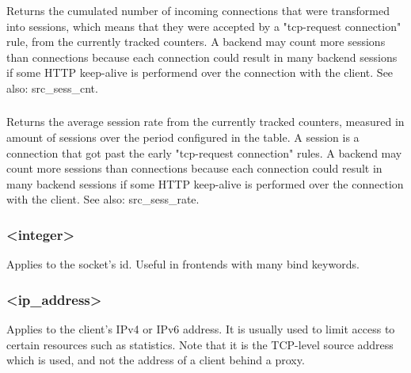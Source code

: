\subsubsection[sc1\_sess\_cnt]{}
\subsubsection[sc2\_sess\_cnt]{}
  Returns the cumulated number of incoming connections that were transformed
  into sessions, which means that they were accepted by a "tcp-request
  connection" rule, from the currently tracked counters. A backend may count
  more sessions than connections because each connection could result in many
  backend sessions if some HTTP keep-alive is performend over the connection
  with the client.
See also: src\_sess\_cnt.

\subsubsection[sc1\_sess\_rate]{}
\subsubsection[sc2\_sess\_rate]{}
  Returns the average session rate from the currently tracked counters,
  measured in amount of sessions over the period configured in the table. A
  session is a connection that got past the early "tcp-request connection"
  rules. A backend may count more sessions than connections because each
  connection could result in many backend sessions if some HTTP keep-alive is
  performed over the connection with the client.
See also: src\_sess\_rate.

\subsubsection[so\_id]{ <integer>}
  Applies to the socket's id. Useful in frontends with many bind keywords.

\subsubsection[src]{ <ip\_address>}
  Applies to the client's IPv4 or IPv6 address. It is usually used to limit
  access to certain resources such as statistics. Note that it is the TCP-level
  source address which is used, and not the address of a client behind a proxy.

